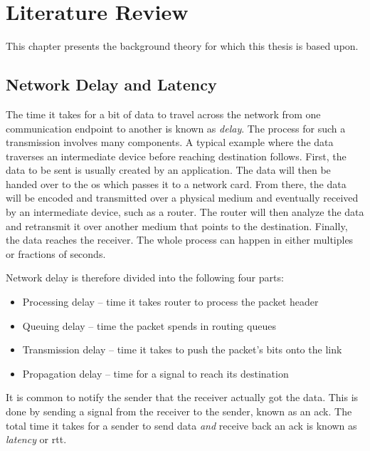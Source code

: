 \chapter{Literature Review}

This chapter presents the background theory for which this thesis is based upon.



\section{Network Delay and Latency}

The time it takes for a bit of data to travel across the network from one communication endpoint to another is known as \textit{delay}. The process for such a transmission involves many components. A typical example where the data traverses an intermediate device before reaching destination follows. First, the data to be sent is usually created by an application. The data will then be handed over to the \gls{os} which passes it to a network card. From there, the data will be encoded and transmitted over a physical medium and eventually received by an intermediate device, such as a router. The router will then analyze the data and retransmit it over another medium that points to the destination. Finally, the data reaches the receiver. The whole process can happen in either multiples or fractions of seconds.


Network delay is therefore divided into the following four parts:

\begin{itemize}
    \item Processing delay – time it takes router to process the packet header
    \item Queuing delay – time the packet spends in routing queues
    \item Transmission delay – time it takes to push the packet's bits onto the link
    \item Propagation delay – time for a signal to reach its destination
\end{itemize}

It is common to notify the sender that the receiver actually got the data. This is done by sending a signal from the receiver to the sender, known as an \gls{ack}. The total time it takes for a sender to send data \textit{and} receive back an \gls{ack} is known as \textit{latency} or \gls{rtt}.

